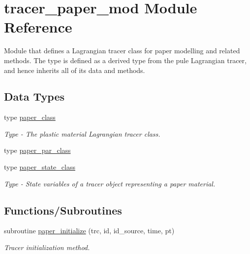 \hypertarget{namespacetracer__paper__mod}{}\section{tracer\+\_\+paper\+\_\+mod Module Reference}
\label{namespacetracer__paper__mod}


Module that defines a Lagrangian tracer class for paper modelling and related methods. The type is defined as a derived type from the pule Lagrangian tracer, and hence inherits all of it\textquotesingle{}s data and methods.  


\subsection*{Data Types}
\begin{DoxyCompactItemize}
\item 
type \mbox{\hyperlink{structtracer__paper__mod_1_1paper__class}{paper\+\_\+class}}
\begin{DoxyCompactList}\small\item\em Type -\/ The plastic material Lagrangian tracer class. \end{DoxyCompactList}\item 
type \mbox{\hyperlink{structtracer__paper__mod_1_1paper__par__class}{paper\+\_\+par\+\_\+class}}
\item 
type \mbox{\hyperlink{structtracer__paper__mod_1_1paper__state__class}{paper\+\_\+state\+\_\+class}}
\begin{DoxyCompactList}\small\item\em Type -\/ State variables of a tracer object representing a paper material. \end{DoxyCompactList}\end{DoxyCompactItemize}
\subsection*{Functions/\+Subroutines}
\begin{DoxyCompactItemize}
\item 
subroutine \mbox{\hyperlink{namespacetracer__paper__mod_a4e3b16f967d34cd206499188e17ac4f2}{paper\+\_\+initialize}} (trc, id, id\+\_\+source, time, pt)
\begin{DoxyCompactList}\small\item\em Tracer initialization method. \end{DoxyCompactList}\end{DoxyCompactItemize}


